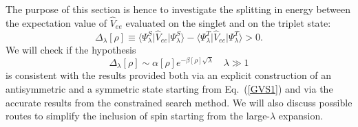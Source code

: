 \documentclass[aps,pra,twocolumn,superscriptaddress]{revtex4}
\begin{document}
The purpose of this section is hence to investigate the splitting in energy between the expectation value of $\hat{V}_{ee}$ evaluated on the singlet and on the triplet state:
\begin{equation}
\Delta_{\lambda}[\rho]\equiv\langle\Psi_{\lambda}^S\vert\hat{V}_{ee}\vert\Psi_{\lambda}^S\rangle-\langle\Psi_{\lambda}^T\vert\hat{V}_{ee}\vert\Psi_{\lambda}^T\rangle>0.
\end{equation} 
We will check if the hypothesis
\begin{equation}\label{ansatzsplitting}
\Delta_{\lambda}[\rho]\sim \alpha[\rho]e^{-\beta[\rho]\sqrt{\lambda}}\quad\lambda\gg1
\end{equation} 
is consistent with the results provided both via an explicit construction of an antisymmetric and a symmetric state starting from Eq.~(\ref{GVS1}) and via the accurate results from the constrained search method. We will also discuss possible routes to simplify the inclusion of spin starting from the large-$\lambda$ expansion.
\end{document}
